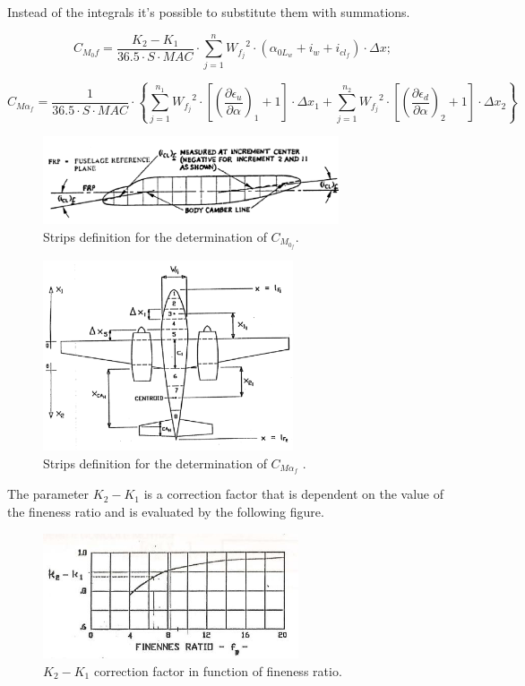 Instead of the integrals it’s possible to substitute them with summations.

\begin{equation}
C_{M_{0}f}=\dfrac{K_2-K_1}{36.5\cdot S\cdot MAC}\cdot\sum_{j=1}^{n} \! {W_{f_j}}^2\cdot\left(\alpha_{{0L}_w}+i_w+i_{{cl}_f}\right)\cdot \Delta x;
\end{equation}

\begin{equation}
C_{{M\alpha}_f}=\dfrac{1}{36.5\cdot S\cdot MAC}\cdot \left\{ \sum_{j=1}^{n_1} \! {W_{f_j}}^2\cdot \left[ {\left( \dfrac{\partial \epsilon_u}{\partial \alpha} \right)}_1 +1\right] \cdot \Delta x_{1} + \sum_{j=1}^{n_2} \! {W_{f_j}}^2\cdot \left[ {\left( \dfrac{\partial \epsilon_d}{\partial \alpha} \right)}_2 +1\right] \cdot \Delta x_{2} \right\}
\end{equation}


\begin{figure}[H]
\centering
\includegraphics[height=2.6cm]{Immagini/stripszero}
\caption{Strips definition for the determination of $C_{M_{0_f}}$.}
\label{wing}
\end{figure}

\begin{figure}[H]
\centering
\includegraphics[height=5.6cm]{Immagini/stripsalfa}
\caption{Strips definition for the determination of $C_{{M\alpha}_f}$ .}
\label{wing}
\end{figure}


The parameter $K_2-K_1$ is a correction factor that is dependent on the value of the fineness ratio and is evaluated by the following figure.\cite{adas}


\begin{figure}[H]
\centering
\includegraphics[height=3.7cm]{Immagini/kdue}
\caption{$K_2-K_1$ correction factor in function of fineness ratio.}
\label{kfactor}
\end{figure}

